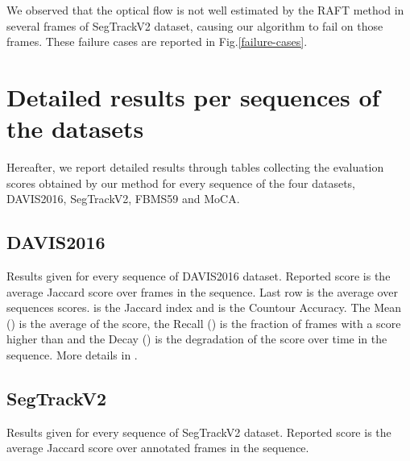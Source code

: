 \documentclass[10pt,twocolumn,letterpaper]{article}
\begin{document}
We observed that the optical flow is not well estimated by the RAFT method in several frames of SegTrackV2 dataset, causing our algorithm to fail on those frames. These failure cases are reported in Fig.\ref{failure-cases}.


\section{Detailed results per sequences of the datasets}
Hereafter, we report detailed results through tables collecting the evaluation scores obtained by our method for every sequence of the four datasets, DAVIS2016, SegTrackV2, FBMS59 and MoCA.

\subsection{DAVIS2016}

\begin{table}[H]\centering
{}
\caption{Results given for every sequence of DAVIS2016 dataset. Reported score is the average Jaccard score over frames in the sequence. Last row is the average over sequences scores.
 is the Jaccard index and  is the Countour Accuracy. The Mean () is the average of the score, the Recall () is the fraction of frames with a score higher than  and the Decay () is the degradation of the score over time in the sequence. More details in \cite{pont-tuset_benchmark_2016}.}
\end{table}



\subsection{SegTrackV2}


\begin{table}[H]\centering
{}
\caption{Results given for every sequence of SegTrackV2 dataset. Reported score is the average Jaccard score over annotated frames in the sequence.}
\end{table}
\end{document}
